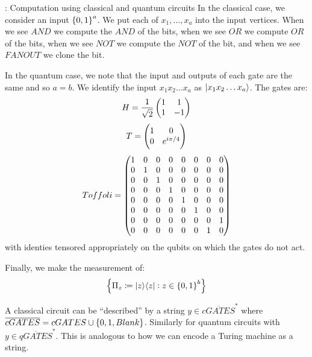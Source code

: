 \begin{defbox}{: Computation using classical and quantum circuits}
    In the classical case, we consider an input $\set{0, 1}^a$. We put each of $x_1, \ldots, x_a$ into the input vertices. When we see $AND$ we compute the $AND$ of the bits, when we see $OR$ we compute $OR$ of the bits, when we see $NOT$ we compute the $NOT$ of the bit, and when we see $FANOUT$ we clone the bit.

    In the quantum case, we note that the input and outputs of each gate are the same and so $a = b$. We identify the input $x_1x_2\ldots x_a$ as $\lvert x_1x_2\ldots x_a \rangle$. The gates are:
    \begin{equation}
        H = \frac{1}{\sqrt{2}}\begin{pmatrix}1 & 1 \\ 1 & -1\end{pmatrix}
    \end{equation}
    \begin{equation}
        T = \begin{pmatrix}1 & 0 \\ 0 & e^{i\pi/4}\end{pmatrix}
    \end{equation}
    \begin{equation}
        Toffoli = \begin{pmatrix}1 & 0 & 0 & 0 & 0 & 0 & 0 & 0 \\ 0 & 1 & 0 & 0 & 0 & 0 & 0 & 0 \\ 0 & 0 & 1 & 0 & 0 & 0 & 0 & 0 \\ 0 & 0 & 0 & 1 & 0 & 0 & 0 & 0 \\ 0 & 0 & 0 & 0 & 1 & 0 & 0 & 0 \\ 0 & 0 & 0 & 0 & 0 & 1 & 0 & 0 \\ 0 & 0 & 0 & 0 & 0 & 0 & 0 & 1 \\ 0 & 0 & 0 & 0 & 0 & 0 & 1 & 0\end{pmatrix}
    \end{equation}
    with identies tensored appropriately on the qubits on which the gates do not act.

    Finally, we make the measurement of:
    \begin{equation}
        \set{\Pi_z \coloneqq \lvert z \rangle \langle z \rvert : z \in \set{0, 1}^b}
    \end{equation}

    A classical circuit can be ``described'' by a string $y \in \overline{cGATES}^*$ where $\overline{cGATES} = cGATES \cup \set{0, 1, Blank}$. Similarly for quantum circuits with $y \in \overline{qGATES}^*$. This is analogous to how we can encode a Turing machine as a string.
\end{defbox}

